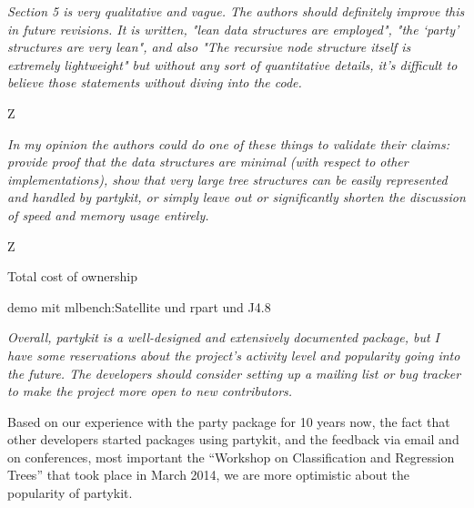 \documentclass{article}
\begin{document}
\textit{
Section 5 is very qualitative and vague.  The authors should definitely
improve this in future revisions.  It is written, "lean data structures are
employed", "the `party' structures are very lean", and also "The recursive
node structure itself is extremely lightweight" but without any sort of
quantitative details, it's difficult to believe those statements without
diving into the code.}

Z

\textit{
In my opinion the authors could do one of these things to validate their
claims: provide proof that the data structures are minimal (with respect to
other implementations), show that very large tree structures can be easily
represented and handled by partykit, or simply leave out or significantly
shorten the discussion of speed and memory usage entirely.}

Z

Total cost of ownership

demo mit mlbench:Satellite und rpart und J4.8

\textit{
Overall, partykit is a well-designed and extensively documented package, but
I have some reservations about the project's activity level and popularity
going into the future.  The developers should consider setting up a mailing
list or bug tracker to make the project more open to new contributors.}

Based on our experience with the party package for 10 years now, the fact
that other developers started packages using partykit, and the feedback via
email and on conferences, most important the ``Workshop on Classification
and Regression Trees'' that took place in March 2014, we are more optimistic
about the popularity of partykit.



\end{document}
